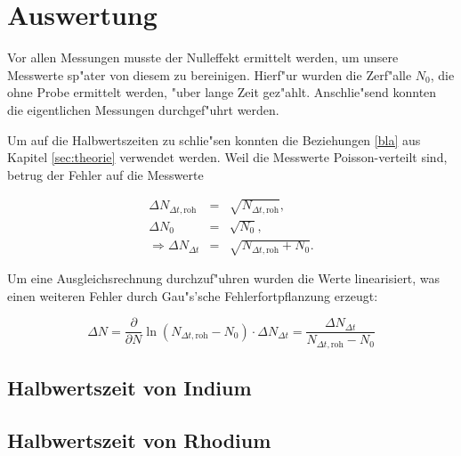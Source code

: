 \section{Auswertung}
	\label{sec:auswertung}
	Vor allen Messungen musste der Nulleffekt ermittelt werden, um unsere Messwerte sp"ater von diesem zu bereinigen.
	Hierf"ur wurden die Zerf"alle $N_0$, die ohne Probe ermittelt werden, "uber lange Zeit gez"ahlt.
	Anschlie"send konnten die eigentlichen Messungen durchgef"uhrt werden.
	

	Um auf die Halbwertszeiten zu schlie"sen konnten die Beziehungen \eqref{bla} aus Kapitel \ref{sec:theorie} verwendet werden.
	Weil die Messwerte Poisson-verteilt sind, betrug der Fehler auf die Messwerte

	\begin{eqnarray}
		\Delta N_{\Delta t, \mathrm{roh}} & = & \sqrt{N_{\Delta t, \mathrm{roh}}}, \\
		\Delta N_0 & = & \sqrt{N_0},\\
		\Rightarrow \Delta N_{\Delta t} & = & \sqrt{N_{\Delta t, \mathrm{roh}} + N_0}.
	\end{eqnarray}

	Um eine Ausgleichsrechnung durchzuf"uhren wurden die Werte linearisiert, was einen weiteren Fehler durch Gau"s'sche Fehlerfortpflanzung erzeugt:

	\begin{equation}
		\Delta N = \frac{\partial}{\partial N} \ln{\left( N_{\Delta t, \mathrm{roh}} - N_0 \right)} \cdot \Delta N_{\Delta t} = \frac{\Delta N_{\Delta t}}{N_{\Delta t, \mathrm{roh}} - N_0}
	\end{equation}

	\subsection{Halbwertszeit von Indium}
		\label{subsec:indium}

	\subsection{Halbwertszeit von Rhodium}
		\label{subsec:rhodium}